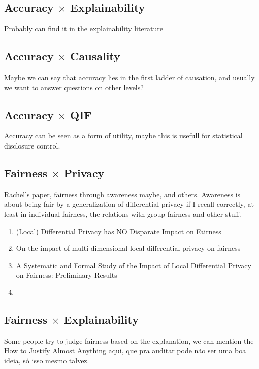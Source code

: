 \subsection{Accuracy $\times$ Explainability}

{\color{red} Probably can find it in the explainability literature}

\subsection{Accuracy $\times$ Causality}

{\color{red} Maybe we can say that accuracy lies in the first ladder of causation, and usually we want to answer questions on other levels?}

\subsection{Accuracy $\times$ QIF}

{\color{red} Accuracy can be seen as a form of utility, maybe this is usefull for statistical disclosure control.}

\subsection{Fairness $\times$ Privacy}

{\color{red} Rachel's paper, fairness through awareness maybe, and others. Awareness is about being fair by a generalization of differential privacy if I recall correctly, at least in individual fairness, the relations with group fairness and other stuff.}

\begin{enumerate}
\item (Local) Differential Privacy has NO Disparate Impact on Fairness
\item On the impact of multi-dimensional local differential privacy on fairness
\item A Systematic and Formal Study of the Impact of Local Differential Privacy on Fairness: Preliminary Results
\item 
\end{enumerate}

\subsection{Fairness $\times$ Explainability}

{\color{red} Some people try to judge fairness based on the explanation, we can mention the How to Justify Almost Anything aqui, que pra auditar pode não ser uma boa ideia, só isso mesmo talvez.}

